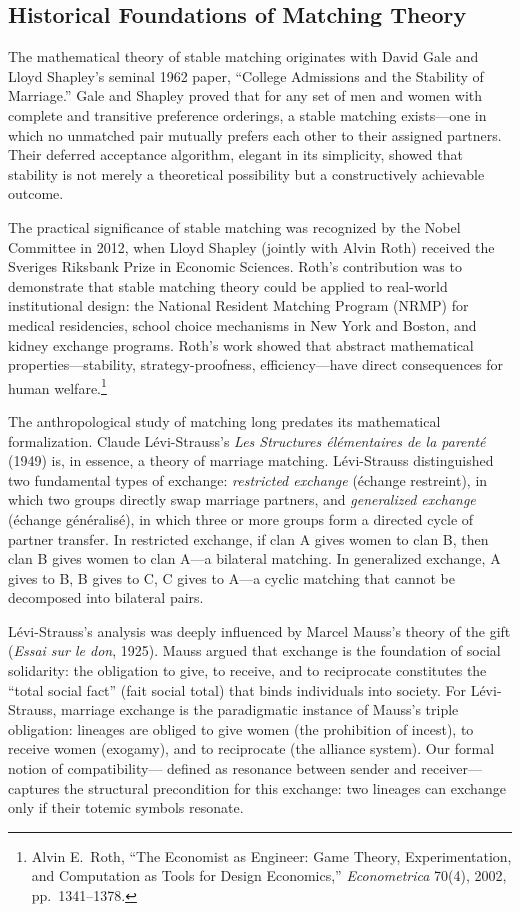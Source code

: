 \subsection{Historical Foundations of Matching Theory}

The mathematical theory of stable matching originates with David Gale and
Lloyd Shapley's seminal 1962 paper, ``College Admissions and the Stability
of Marriage.''  Gale and Shapley proved that for any set of men and women
with complete and transitive preference orderings, a stable matching
exists---one in which no unmatched pair mutually prefers each other to their
assigned partners.  Their deferred acceptance algorithm, elegant in its
simplicity, showed that stability is not merely a theoretical possibility but
a constructively achievable outcome.

The practical significance of stable matching was recognized by the Nobel
Committee in 2012, when Lloyd Shapley (jointly with Alvin Roth) received the
Sveriges Riksbank Prize in Economic Sciences.  Roth's contribution was to
demonstrate that stable matching theory could be applied to real-world
institutional design: the National Resident Matching Program (NRMP) for
medical residencies, school choice mechanisms in New York and Boston, and
kidney exchange programs.  Roth's work showed that abstract mathematical
properties---stability, strategy-proofness, efficiency---have direct
consequences for human welfare.\footnote{Alvin E.\ Roth, ``The Economist as
Engineer: Game Theory, Experimentation, and Computation as Tools for Design
Economics,'' \textit{Econometrica} 70(4), 2002, pp.\ 1341--1378.}

The anthropological study of matching long predates its mathematical
formalization.  Claude Lévi-Strauss's \textit{Les Structures élémentaires
de la parenté} (1949) is, in essence, a theory of marriage matching.
Lévi-Strauss distinguished two fundamental types of exchange:
\emph{restricted exchange} (échange restreint), in which two groups
directly swap marriage partners, and \emph{generalized exchange} (échange
généralisé), in which three or more groups form a directed cycle of
partner transfer.  In restricted exchange, if clan A gives women to clan B,
then clan B gives women to clan A---a bilateral matching.  In generalized
exchange, A gives to B, B gives to C, C gives to A---a cyclic matching
that cannot be decomposed into bilateral pairs.

Lévi-Strauss's analysis was deeply influenced by Marcel Mauss's theory of
the gift (\textit{Essai sur le don}, 1925).  Mauss argued that exchange is
the foundation of social solidarity: the obligation to give, to receive,
and to reciprocate constitutes the ``total social fact'' (fait social total)
that binds individuals into society.  For Lévi-Strauss, marriage exchange is
the paradigmatic instance of Mauss's triple obligation: lineages are obliged
to give women (the prohibition of incest), to receive women (exogamy), and
to reciprocate (the alliance system).  Our formal notion of compatibility---
defined as resonance between sender and receiver---captures the structural
precondition for this exchange: two lineages can exchange only if their
totemic symbols resonate.

